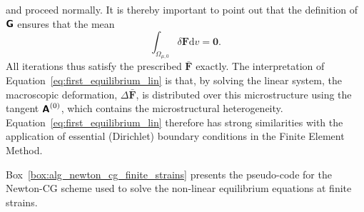 and proceed normally.
It is thereby important to point out that the definition of \(\boldsymbol{\mathsf{G}}\) ensures that the mean
\begin{equation}
\int_{\Omega_{\mu,0}} \delta {\bm {F}} \mathrm{d} v=\boldsymbol{0}.
\end{equation}
All iterations thus satisfy the prescribed \(\bar{\bm{F}}\) exactly.
The interpretation of Equation~\eqref{eq:first_equilibrium_lin} is that, by solving the linear system, the macroscopic deformation, \(\Delta \bar{\bm{F}}\), is distributed over this microstructure using the tangent \(\boldsymbol{\mathsf{A}}^{(0)}\), which contains the microstructural heterogeneity.
Equation~\eqref{eq:first_equilibrium_lin} therefore has strong similarities with the application of essential (Dirichlet) boundary conditions in the Finite Element Method.
\bigskip

Box~\ref{box:alg_newton_cg_finite_strains} presents the pseudo-code for the Newton-CG scheme used to solve the non-linear equilibrium equations at finite strains.


